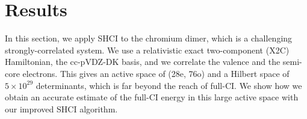 \documentclass[%
reprint,
 superscriptaddress,
 amsmath,amssymb,
 aps,
]{revtex4-1}
\begin{document}






\section{Results}
\label{results}

In this section, we apply SHCI to the chromium dimer, which is a challenging strongly-correlated system.
We use a relativistic exact two-component (X2C) Hamiltonian, the cc-pVDZ-DK basis, and we correlate the valence and the semi-core electrons.
This gives an active space of (28e, 76o) and a Hilbert space of $5\times10^{29}$ determinants, which is far beyond the reach of full-CI.
We show how we obtain an accurate estimate of the full-CI energy in this large active space with our improved SHCI algorithm.
\end{document}
